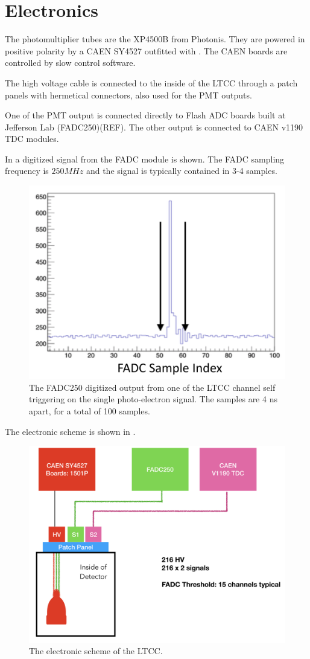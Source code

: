 \section{Electronics}



The photomultiplier tubes are the XP4500B from Photonis. They are powered in positive polarity by a CAEN SY4527 outfitted with . The CAEN boards are controlled by slow control software.

The high voltage cable is connected to the inside of the LTCC through a patch panels with hermetical connectors, also used for the PMT outputs.

One of the PMT output is connected directly to Flash ADC boards built at Jefferson Lab (FADC250)(REF). The other output is connected to CAEN v1190 TDC modules.

In  a digitized signal from the FADC module is shown. The FADC sampling frequency is $250 MHz$ and the signal is typically contained in 3-4
samples.

\begin{figure}
	\centering
	\includegraphics[width=0.95\columnwidth,keepaspectratio]{img/fadc.png}
	\caption{The FADC250 digitized output from one of the LTCC channel self triggering on the single photo-electron signal. The samples are 4 ns apart, for a total of 100 samples. }
	\label{fig:fadc}
\end{figure}


The electronic scheme is shown in .

\begin{figure}
	\centering
	\includegraphics[width=0.95\columnwidth,keepaspectratio]{img/electronicScheme.png}
	\caption{The electronic scheme of the LTCC.}
	\label{fig:electronicScheme}
\end{figure}
